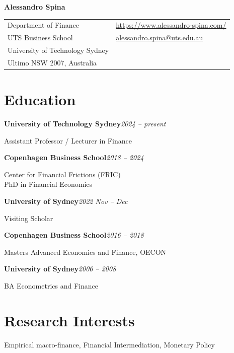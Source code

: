 \documentclass[11pt,a4paper]{article}
\newcommand{\cventry}[3]{%
  \noindent\textbf{#1}\hfill\textit{#2}\par
  #3\par\medskip
}
\begin{document}
\thispagestyle{firstpage}

\begin{center}
{\Huge\bfseries Alessandro Spina}
\end{center}

\vspace{0.6em}

\noindent
\begin{tabularx}{\textwidth}{@{}X X@{}}
Department of Finance               & \href{https://www.alessandro-spina.com/}{https://www.alessandro-spina.com/} \\
UTS Business School                  & \href{mailto:alessandro.spina@uts.edu.au}{alessandro.spina@uts.edu.au} \\
University of Technology Sydney      & \\
Ultimo NSW 2007, Australia           & \\
\end{tabularx}

\section{Education}

\cventry{University of Technology Sydney}{2024 -- present}{Assistant Professor / Lecturer in Finance}

\cventry{Copenhagen Business School}{2018 -- 2024}{Center for Financial Frictions (FRIC)\\PhD in Financial Economics}

\cventry{University of Sydney}{2022 Nov -- Dec}{Visiting Scholar}

\cventry{Copenhagen Business School}{2016 -- 2018}{Masters Advanced Economics and Finance, OECON}

\cventry{University of Sydney}{2006 -- 2008}{BA Econometrics and Finance}

\section{Research Interests}

Empirical macro-finance, Financial Intermediation, Monetary Policy

\end{document}
